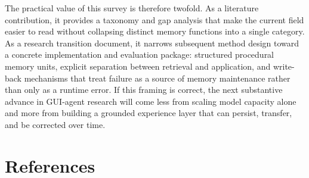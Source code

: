 \documentclass{article}
\begin{document}
The practical value of this survey is therefore twofold. As a literature
contribution, it provides a taxonomy and gap analysis that make the
current field easier to read without collapsing distinct memory
functions into a single category. As a research transition document, it
narrows subsequent method design toward a concrete implementation and
evaluation package: structured procedural memory units, explicit
separation between retrieval and application, and write-back mechanisms
that treat failure as a source of memory maintenance rather than only as
a runtime error. If this framing is correct, the next substantive
advance in GUI-agent research will come less from scaling model capacity
alone and more from building a grounded experience layer that can
persist, transfer, and be corrected over time.

\section{References}

\nocite{*}
\printbibliography[heading=none]
\end{document}
